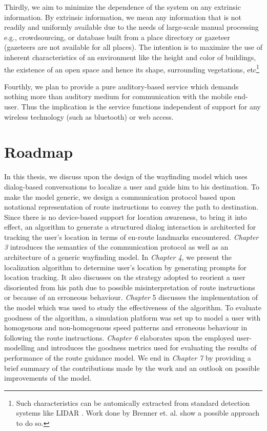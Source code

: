 \documentclass{iitkthesis}
\begin{document}
Thirdly, we aim to minimize the dependence of the system on any extrinsic information. By extrinsic information, we mean any information that is not readily and uniformly available due to the needs of large-scale manual processing e.g., crowdsourcing, or database built from a place directory or gazeteer (gazeteers are not available for all places). The intention is to maximize the use of inherent characteristics of an environment like the height and color of buildings, the existence of an open space and hence its shape, surrounding vegetations, etc\footnote{Such characteristics can be automically extracted from standard detection systems like LIDAR \cite{lidar}. Work done by Brenner et. al. \cite{brenner} show a possible approach to do so.}

Fourthly, we plan to provide a pure auditory-based service which demands nothing more than auditory medium for communication with the mobile end-user. Thus the implication is the service functions independent of support for any wireless technology (such as bluetooth) or web access.
  \section{Roadmap}
  In this thesis, we discuss upon the design of the wayfinding model which uses dialog-based conversations to localize a user and guide him to his destination. To make the model generic, we design a communication protocol based upon notational representation of route instructions to convey the path to destination. Since there is no device-based support for location awareness, to bring it into effect, an algorithm to generate a structured dialog interaction is architected for tracking the user's location in terms of en-route landmarks encountered. \textit{Chapter 3} introduces the semantics of the communication protocol as well as an architecture of a generic wayfinding model. In \textit{Chapter 4}, we present the localization algorithm to determine user's location by generating prompts for location tracking. It also discusses on the strategy adopted to reorient a user disoriented from his path due to possible misinterpretation of route instructions or because of an erroneous behaviour. \textit{Chapter} 5 discusses the implementation of the model which was used to study the effectiveness of the algorithm. To evaluate goodness of the algorithm, a simulation platform was set up to model a user with homogenous and non-homogenous speed patterns and erroneous behaviour in following the route instructions. \textit{Chapter 6} elaborates upon the employed user-modelling and introduces the goodness metrics used for evaluating the results of performance of the route guidance model. We end in \textit{Chapter 7} by providing a brief summary of the contributions made by the work and an outlook on possible improvements of the model.
\end{document}
